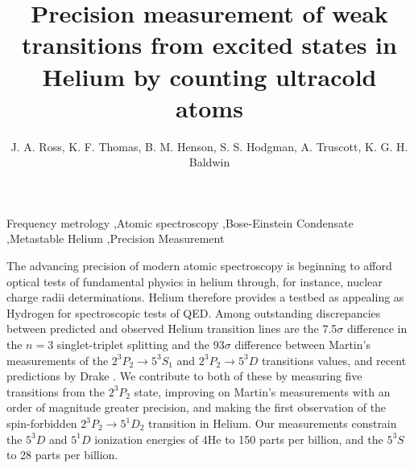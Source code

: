 


\begin{frontmatter}

\title{Precision measurement of weak transitions from excited states in Helium by counting ultracold atoms}

\author{J. A. Ross, K. F. Thomas, B. M. Henson, S. S. Hodgman, A. Truscott, K. G. H. Baldwin}
\address{ Laser Physics Centre, Research School of Physics and Engineering, The Australian National University, Canberra, ACT 2601, Australia
}%
\date{}
\begin{keyword}
Frequency metrology \sep Atomic spectroscopy \sep Bose-Einstein Condensate \sep Metastable Helium \sep Precision Measurement

\end{keyword}


\end{frontmatter}



The advancing precision of modern atomic spectroscopy is beginning to afford optical tests of fundamental physics in helium through, for instance, nuclear charge radii determinations\cite{Pachucki2017}. Helium therefore provides a testbed as appealing as Hydrogen for spectroscopic tests of QED. Among outstanding discrepancies between predicted and observed Helium transition lines are the 7.5$\sigma$ difference in the $n=3$ singlet-triplet splitting\cite{Luo2015} and the $93\sigma$ difference between Martin's measurements of the $2^3P_2 \rightarrow 5^3S_1$ and $2^3P_2 \rightarrow5^3D$ transitions values, and recent predictions by Drake \cite{Drake2007}.
We contribute to both of these by measuring five transitions from the $2^3P_2$ state, improving on Martin's measurements with an order of magnitude greater precision, and making the first observation of the spin-forbidden $2^3P_2\rightarrow5^1D_2$ transition in Helium. Our measurements constrain  the $5^3D$ and $5^1D$ ionization energies of 4He\cite{Morton2006} to 150 parts per billion, and the $5^3S$ to 28 parts per billion.


